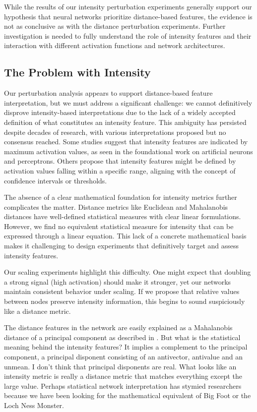 While the results of our intensity perturbation experiments generally support our hypothesis that neural networks prioritize distance-based features, the evidence is not as conclusive as with the distance perturbation experiments. Further investigation is needed to fully understand the role of intensity features and their interaction with different activation functions and network architectures.

\subsection{The Problem with Intensity}

Our perturbation analysis appears to support distance-based feature interpretation, but we must address a significant challenge: we cannot definitively disprove intensity-based interpretations due to the lack of a widely accepted definition of what constitutes an intensity feature. This ambiguity has persisted despite decades of research, with various interpretations proposed but no consensus reached. Some studies suggest that intensity features are indicated by maximum activation values, as seen in the foundational work on artificial neurons and perceptrons. Others propose that intensity features might be defined by activation values falling within a specific range, aligning with the concept of confidence intervals or thresholds.

The absence of a clear mathematical foundation for intensity metrics further complicates the matter. Distance metrics like Euclidean and Mahalanobis distances have well-defined statistical measures with clear linear formulations. However, we find no equivalent statistical measure for intensity that can be expressed through a linear equation. This lack of a concrete mathematical basis makes it challenging to design experiments that definitively target and assess intensity features.

Our scaling experiments highlight this difficulty. One might expect that doubling a strong signal (high activation) should make it stronger, yet our networks maintain consistent behavior under scaling. If we propose that relative values between nodes preserve intensity information, this begins to sound suspiciously like a distance metric.

The distance features in the network are easily explained as a Mahalanobis distance of a principal component as described in \cite{oursland2024interpreting}. But what is the statistical meaning behind the intensity features? It implies a complement to the principal component, a principal disponent consisting of an antivector, antivalue and an unmean. I don't think that principal disponents are real. What looks like an intensity metric is really a distance metric that matches everything except the large value. Perhaps statistical network interpretation has stymied researchers because we have been looking for the mathematical equivalent of Big Foot or the Loch Ness Monster.